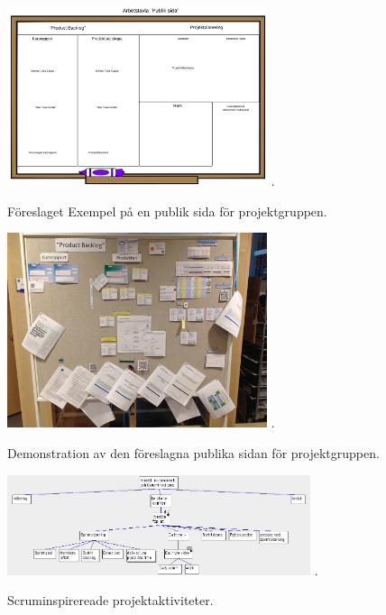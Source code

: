 \documentclass[conference,a4paper]{IEEEtran}
\begin{document}
\begin{figure}[H]
\centering
\includegraphics[width=3in]{forslagproductbacklog}
\DeclareGraphicsExtensions.
\caption{Föreslaget Exempel på en publik sida för projektgruppen.}
\label{forslagproductbacklog}
\end{figure}

\begin{figure}[H]
\centering
\includegraphics[width=3in]{forslagriktigproduct}
\DeclareGraphicsExtensions.
\caption{Demonstration av den föreslagna publika sidan för projektgruppen.}
\label{forslagriktigproduct}
\end{figure}

\begin{figure}[H]
\centering
\includegraphics[width=3.5in]{scrum}
\DeclareGraphicsExtensions.
\caption{Scruminspirereade projektaktiviteter.}
\label{scruminspo}
\end{figure}
\end{document}
